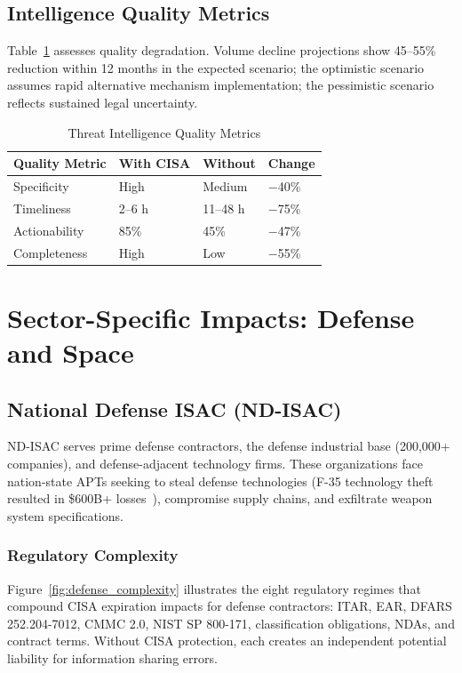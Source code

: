 \documentclass[journal]{IEEEtran}
\begin{document}
\subsection{Intelligence Quality Metrics}

Table~\ref{tab:quality} assesses quality degradation. Volume decline projections show 45--55\% reduction within 12 months in the expected scenario; the optimistic scenario assumes rapid alternative mechanism implementation; the pessimistic scenario reflects sustained legal uncertainty.

\begin{table}[!t]
\caption{Threat Intelligence Quality Metrics}
\centering\small
\begin{tabular}{@{}p{2.2cm}lll@{}}
\toprule
\textbf{Quality Metric} & \textbf{With CISA} & \textbf{Without} & \textbf{Change} \\
\midrule
Specificity   & High   & Medium & $-$40\% \\
Timeliness    & 2--6 h & 11--48 h & $-$75\% \\
Actionability & 85\%   & 45\%     & $-$47\% \\
Completeness  & High   & Low      & $-$55\% \\
\bottomrule
\end{tabular}
\label{tab:quality}
\end{table}

\section{Sector-Specific Impacts: Defense and Space}

\subsection{National Defense ISAC (ND-ISAC)}

ND-ISAC serves prime defense contractors, the defense industrial base (200,000+ companies), and defense-adjacent technology firms. These organizations face nation-state APTs seeking to steal defense technologies (F-35 technology theft resulted in \$600B+ losses~\cite{mcleary2024theft}), compromise supply chains, and exfiltrate weapon system specifications.

\subsubsection{Regulatory Complexity}
Figure~\ref{fig:defense_complexity} illustrates the eight regulatory regimes that compound CISA expiration impacts for defense contractors: ITAR, EAR, DFARS 252.204-7012, CMMC 2.0, NIST SP 800-171, classification obligations, NDAs, and contract terms. Without CISA protection, each creates an independent potential liability for information sharing errors.
\end{document}
